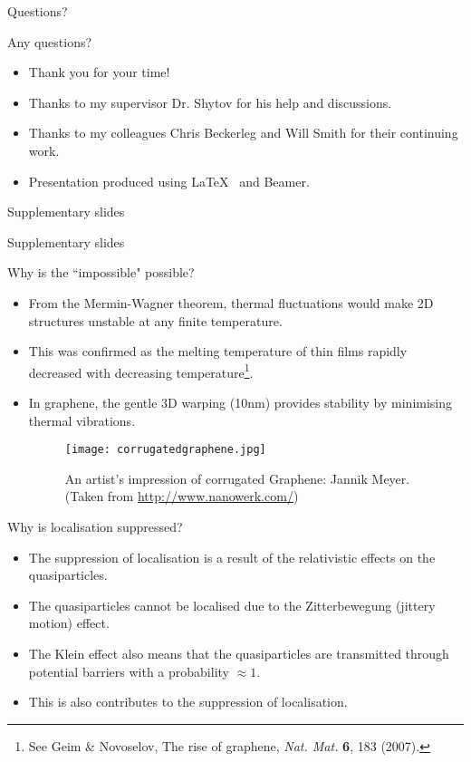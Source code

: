 \documentclass{beamer}
\begin{document}
\begin{frame}[t]{Questions?}
\begin{center}
{\huge Any questions?}
\end{center}
\begin{itemize}
\item Thank you for your time!
\item Thanks to my supervisor Dr. Shytov for his help and discussions.
\item Thanks to my colleagues Chris Beckerleg and Will Smith for their continuing work.
\item Presentation produced using \LaTeX ~ and Beamer.
\end{itemize}
\end{frame}

\begin{frame}{Supplementary slides}
\begin{center}
{\Huge Supplementary slides}
\end{center}
\end{frame}

\begin{frame}[t]{Why is the ``impossible" possible?}
\begin{itemize}
\item From the Mermin-Wagner theorem, thermal fluctuations would	 make 2D structures unstable at any finite temperature.
\item This was confirmed as the melting temperature of thin films rapidly decreased with decreasing temperature\footnote{See Geim \& Novoselov, The rise of graphene, \emph{Nat. Mat.} {\bf 6}, 183 (2007).}.
\item In graphene, the gentle 3D warping (\urltilde10nm) provides stability by minimising thermal vibrations.
\begin{figure}[c]
\texttt{[image: corrugatedgraphene.jpg]}
\caption{An artist's impression of corrugated Graphene: Jannik Meyer. (Taken from \url{http://www.nanowerk.com/})}
\end{figure}
\end{itemize}
\end{frame}



\begin{frame}[t]{Why is localisation suppressed?}
\begin{itemize}
\item The suppression of localisation is a result of the relativistic effects on the quasiparticles.
\item The quasiparticles cannot be localised due to the Zitterbewegung (jittery motion) effect.
\item The Klein effect also means that the quasiparticles are transmitted through potential barriers with a probability $\approx 1$.
\item This is also contributes to the suppression of localisation.
\end{itemize}
\end{frame}
\end{document}
